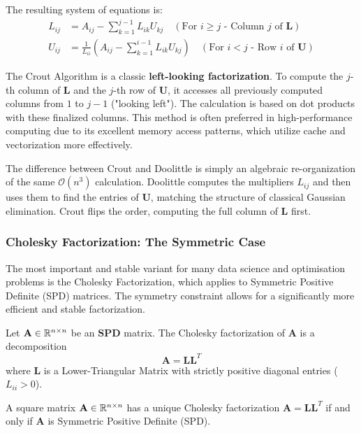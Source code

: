 The resulting system of equations is:
\begin{align} L_{ij} &= A_{ij} - \sum_{k=1}^{j-1} L_{ik} U_{kj} \quad (\text{For } i \ge j \text{ - Column } j \text{ of } \mathbf{L}) \\ U_{ij} &= \frac{1}{L_{ii}} \left( A_{ij} - \sum_{k=1}^{i-1} L_{ik} U_{kj} \right) \quad (\text{For } i < j \text{ - Row } i \text{ of } \mathbf{U}) \end{align}

The Crout Algorithm is a classic \textbf{left-looking factorization}. To compute the $j$-th column of $\mathbf{L}$ and the $j$-th row of $\mathbf{U}$, it accesses all previously computed columns from $1$ to $j-1$ ("looking left"). The calculation is based on dot products with these finalized columns. This method is often preferred in high-performance computing due to its excellent memory access patterns, which utilize cache and vectorization more effectively.

\begin{remark}
The difference between Crout and Doolittle is simply an algebraic re-organization of the same $\mathcal{O}(n^3)$ calculation. Doolittle computes the multipliers $L_{ij}$ and then uses them to find the entries of $\mathbf{U}$, matching the structure of classical Gaussian elimination. Crout flips the order, computing the full column of $\mathbf{L}$ first.
\end{remark}

\subsubsection{Cholesky Factorization: The Symmetric Case}

The most important and stable variant for many data science and optimisation problems is the Cholesky Factorization, which applies to Symmetric Positive Definite (SPD) matrices. The symmetry constraint allows for a significantly more efficient and stable factorization.

\begin{definition}
Let $\mathbf{A} \in \mathbb{R}^{n \times n}$ be an $\mathbf{SPD}$ matrix. The Cholesky factorization of $\mathbf{A}$ is a decomposition
\[ \mathbf{A} = \mathbf{L}\mathbf{L}^T \]
where $\mathbf{L}$ is a Lower-Triangular Matrix with strictly positive diagonal entries ($L_{ii} > 0$).
\end{definition}

\begin{theorem}
A square matrix $\mathbf{A} \in \mathbb{R}^{n \times n}$ has a unique Cholesky factorization $\mathbf{A} = \mathbf{L}\mathbf{L}^T$ if and only if $\mathbf{A}$ is Symmetric Positive Definite (SPD).
\end{theorem}

